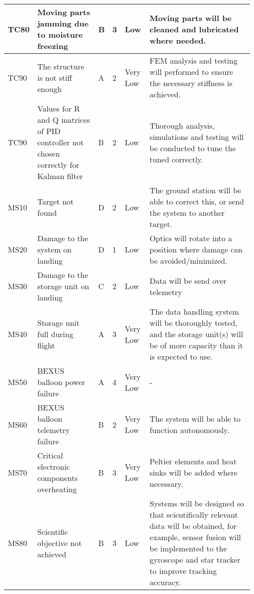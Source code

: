 \begin{longtable}{|m{}| m{} |m{} |m{}|m{}| m{}|}
TC80& Moving parts jamming due to moisture freezing & B & 3 & \cellcolor[HTML]{FCFF2F} Low & Moving parts will be cleaned and lubricated where needed. \\\hline
TC90 & The structure is not stiff enough & A & 2 & \cellcolor[HTML]{34FF34}Very Low & FEM analysis and testing will performed to ensure the necessary stiffness is achieved. \\ \hline

TC90 & Values for R and Q matrices of PID controller not chosen correctly for Kalman filter & B & 2 & \cellcolor[HTML]{FCFF2F}Low	& Thorough analysis, simulations and testing will be conducted to tune the tuned correctly. \\ \hline

MS10 & Target not found	& D & 2 & \cellcolor[HTML]{FCFF2F}Low			& The ground station will be able to correct this, or send the system to another target.\\\hline

MS20 & Damage to the system on landing										& D & 1 & \cellcolor[HTML]{FCFF2F}Low			& Optics will rotate into a position where damage can be avoided/minimized.\\\hline

MS30 & Damage to the storage unit on landing									& C & 2 & \cellcolor[HTML]{FCFF2F}Low			& Data will be send over telemetry\\\hline

MS40 & Storage unit full during flight											& A & 3 & \cellcolor[HTML]{34FF34}Very Low	& The data handling system will be thoroughly tested, and the storage unit(s) will be of more capacity than it is expected to use.\\\hline

MS50 & BEXUS balloon power failure											& A & 4 & \cellcolor[HTML]{34FF34}Very Low	& -\\\hline

MS60 & BEXUS balloon telemetry failure										& B & 2 & \cellcolor[HTML]{34FF34}Very Low	& The system will be able to function autonomously.\\\hline

MS70 & Critical electronic components overheating & B & 3 & \cellcolor[HTML]{34FF34}Very Low & Peltier elements and heat sinks will be added where necessary. \\\hline

MS80 & Scientific objective not achieved & B & 3 & \cellcolor[HTML]{FCFF2F} Low & Systems will be designed so that scientifically relevant data will be obtained, for example, sensor fusion will be implemented to the gyroscope and star tracker to improve tracking accuracy.\\\hline


\end{longtable}
